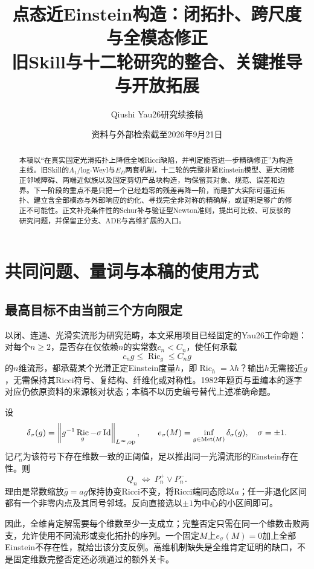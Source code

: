 \documentclass[UTF8,fontset=fandol,zihao=-4]{ctexart}
\title{点态近Einstein构造：闭拓扑、跨尺度与全模态修正\\[3mm]\large 旧Skill与十二轮研究的整合、关键推导与开放拓展}
\author{Qiushi Yau26研究续接稿}
\date{资料与外部检索截至2026年9月21日}
\DeclareMathOperator{\Ric}{Ric}\DeclareMathOperator{\Rm}{Rm}
\DeclareMathOperator{\Id}{Id}\DeclareMathOperator{\Hess}{Hess}
\newcommand{\norm}[1]{\left\|#1\right\|}
\theoremstyle{cn}
\begin{document}
\maketitle
\begin{abstract}

本稿以“在真实固定光滑拓扑上降低全域Ricci缺陷，并判定能否进一步精确修正”为构造主线。旧Skill的$A_1$/log-Weyl与$E_D$两套机制，十二轮的完整非紧Einstein模型、更大闭修正邻域障碍、两端近似族以及固定剪切产品块构造，均保留其对象、规范、误差和边界。下一阶段的重点不是只把一个已经趋零的残差再降一阶，而是扩大实际可逼近拓扑、建立含全部模态与外部响应的约化、寻找完全非对称的精确解，或证明足够广的修正不可能性。正文补充条件性的Schur补与验证型Newton准则，提出可比较、可反驳的研究问题，并保留正分支、ADE与高维扩展的入口。

\end{abstract}\begingroup\small\setlength{\parskip}{0pt}\tableofcontents\endgroup\newpage

\section{共同问题、量词与本稿的使用方式}
\subsection{最高目标不由当前三个方向限定}
以闭、连通、光滑实流形为研究范畴，本文采用项目已经固定的Yau26工作命题：对每个$n\ge2$，是否存在仅依赖$n$的实常数$c_n<C_n$，使任何承载
\[
 c_ng\le\Ric_g\le C_ng
\]
的$n$维流形，都承载某个光滑正定Einstein度量$h$，即$\Ric_h=\lambda h$？输出$h$无需接近$g$，无需保持其Ricci符号、复结构、纤维化或对称性。1982年题页与重编本的逐字对应仍依原资料的来源核对状态；本稿不以历史编号替代上述准确命题。

设
\[
 \delta_\sigma(g)=\norm{g^{-1}\Ric_g-\sigma\Id}_{L^\infty,\op},\qquad
 e_\sigma(M)=\inf_{g\in\Met(M)}\delta_\sigma(g),\quad\sigma=\pm1.
\]
记$P_n^\sigma$为该符号下存在维数一致的正阈值，足以推出同一光滑流形的Einstein存在性。则
\begin{equation}\label{eq:Q}
 Q_n\ \Longleftrightarrow\ P_n^+\lor P_n^-.
\end{equation}
理由是常数缩放$\widehat g=ag$保持协变Ricci不变，将Ricci端同态除以$a$；任一非退化区间都有一个非零内点及其同号邻域。反向直接选以$\pm1$为中心的小区间即可。

因此，全维肯定解需要每个维数至少一支成立；完整否定只需在同一个维数击败两支，允许使用不同流形或变化拓扑的序列。一个固定$M$上$e_\sigma(M)=0$加上全部Einstein不存在性，就给出该分支反例。高维机制缺失是全维肯定证明的缺口，不是固定维数完整否定还必须通过的额外关卡。
\end{document}
